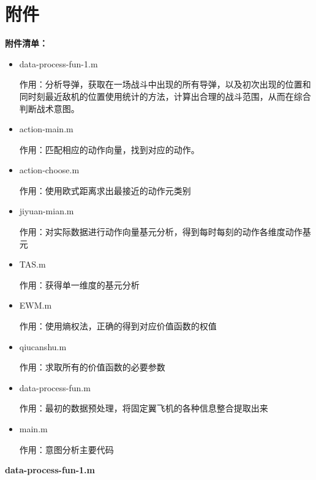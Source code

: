 \documentclass{my_paper}
\begin{document}
\newpage
\section{附件}
\textbf{附件清单：}
\begin{itemize}
    \item data-process-fun-1.m
    
    作用：分析导弹，获取在一场战斗中出现的所有导弹，以及初次出现的位置和同时刻最近敌机的位置使用统计的方法，计算出合理的战斗范围，从而在综合判断战术意图。

    \item action-main.m 
    
    作用：匹配相应的动作向量，找到对应的动作。

    \item action-choose.m 
    
    作用：使用欧式距离求出最接近的动作元类别

    \item jiyuan-mian.m
    
    作用：对实际数据进行动作向量基元分析，得到每时每刻的动作各维度动作基元

    \item TAS.m
    
    作用：获得单一维度的基元分析

    \item EWM.m
    
    作用：使用熵权法，正确的得到对应价值函数的权值

    \item qiucanshu.m
    
    作用：求取所有的价值函数的必要参数

    \item data-process-fun.m
    
    作用：最初的数据预处理，将固定翼飞机的各种信息整合提取出来

    \item main.m
    
    作用：意图分析主要代码

\end{itemize}

\textbf{data-process-fun-1.m}
\end{document}
